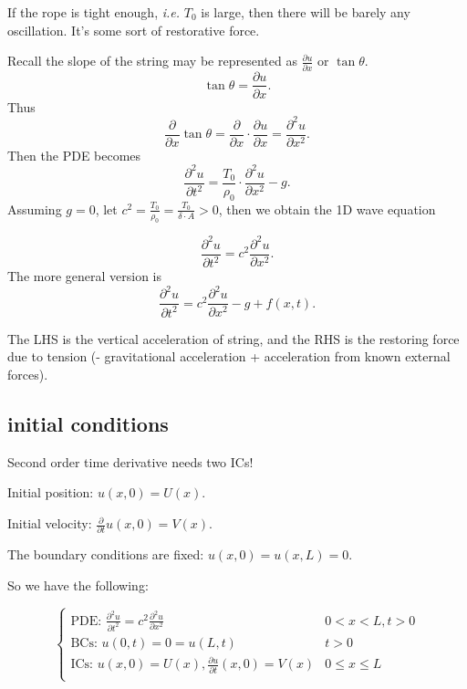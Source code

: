 \documentclass[class=article,crop=false]{standalone}
\begin{document}
\begin{intuition}
	If the rope is tight enough, \emph{i.e.} $ T_0$ is large, then there will be barely any oscillation. It's some sort of restorative force.
\end{intuition} 

Recall the slope of the string may be represented as $ \frac{\partial u}{\partial x} $ or $ \tan \theta$. 
\[
\tan \theta = \frac{\partial u}{\partial x} 
.\]
Thus
\[
\frac{\partial }{\partial x} \tan \theta = \frac{\partial }{\partial x} \cdot  \frac{\partial u}{\partial x} = \frac{\partial^2 u}{\partial { x}^2} 
.\] 
Then the PDE becomes
\[
\frac{\partial^2 u}{\partial { t}^2} = \frac{T_0}{\rho_0} \cdot  \frac{\partial^2 u}{\partial { x}^2} -g
.\] 
Assuming $ g=0$, let  $ c^2 = \frac{T_0}{\rho_0} = \frac{T_0}{\delta \cdot A} > 0$, then we obtain the 1D wave equation
\begin{thm}
\[
\frac{\partial^2 u}{\partial { t}^2} = c^2 \frac{\partial^2 u}{\partial { x}^2} 
.\]
The more general version is
\[
	\frac{\partial^2 u}{\partial { t}^2} = c^2 \frac{\partial^2 u}{\partial { x}^2} - g + f(x,t)
.\]

\end{thm}

The LHS is the vertical acceleration of string, and the RHS is the restoring force due to tension (- gravitational acceleration + acceleration from known external forces). 

\subsection{initial conditions}
Second order time derivative needs two ICs!

Initial position: $ u(x,0)= U(x)$.

Initial velocity:  $ \frac{\partial }{\partial t} u(x,0) = V(x)$.

The boundary conditions are fixed: $ u(x,0)=u(x,L)=0$. 

So we have the following:

\begin{equation*}
\begin{cases}
	\text{PDE: } \frac{\partial^2 u}{\partial { t}^2} = c^2 \frac{\partial^2 u}{\partial { x}^2}  & 0<x<L, t>0 \\
	\text{BCs: } u(0,t) = 0 = u(L,t) & t>0\\
	\text{ICs: } u(x,0)=U(x), \frac{\partial u}{\partial t} (x,0) =V(x) & 0\leq x \leq L\\
\end{cases}
\end{equation*}
\end{document}

